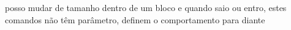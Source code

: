 {\small posso mudar de tamanho {\huge
dentro de um bloco} e quando saio
{\large ou entro}, estes comandos não
têm {\normalsize parâmetro}, definem
o comportamento {\Large para diante}}
